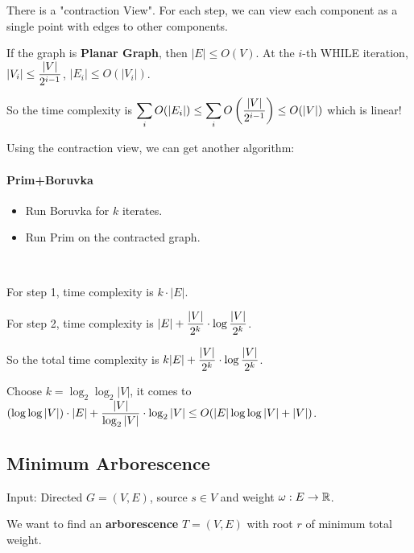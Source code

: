 \begin{remark}
    There is a "contraction View". For each step, we can view each component as a single point with edges to other components.

    If the graph is \textbf{Planar Graph}, then  $ |E| \leq O(V) $. At the  $ i $-th WHILE iteration,   $ |V_i| \leq \displaystyle\frac{|V|}{2^{i-1}} $,  $ |E_i| \leq O(|V_i|) $. 
    
    So the time complexity is  $ \displaystyle\sum_{i}O(|E_i|) \leq \sum_i O\left(\displaystyle\frac{|V|}{2^{i-1}}\right) \leq O(|V|) $ which is linear! 
\end{remark}
Using the contraction view, we can get another algorithm:

\paragraph{Prim+Boruvka} 
\begin{itemize}
    \item Run Boruvka for  $ k $ iterates.
    \item Run Prim on the contracted graph.
\end{itemize}

\begin{remark}
    \,

    For step 1, time  complexity is  $ k\cdot|E| $.

    For step 2, time complexity is   $ |E|+\displaystyle\frac{|V|}{2^k}\cdot\log\frac{|V|}{2^k} $.

    So the total time complexity is  $ k|E|+\displaystyle\frac{|V|}{2^k}\cdot\log\frac{|V|}{2^k} $.

    Choose  $ k=\log_2\log_2|V| $, it  comes to  $ (\log\log|V|)\cdot |E|+\displaystyle\frac{|V|}{\log_2|V|}\cdot\log_2|V| \leq O(|E|\log\log|V|+|V|) $.
\end{remark}

\subsection{Minimum Arborescence}
\begin{example}
    Input: Directed  $ G=(V,E) $, source  $ s\in V $ and weight  $ \omega:E\rightarrow\mathbb R $. 
    
    We want to find an \textbf{arborescence} $ T=(V,E) $ with root  $ r $ of  minimum total weight.
\end{example}

